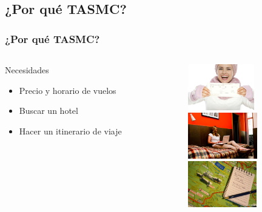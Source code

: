 \documentclass[12pt]{beamer}
\begin{document}
\subsection{¿Por qué TASMC?}
\begin{frame}
	\frametitle{¿Por qué TASMC?}
	\begin{columns} 
		\begin{column}{5cm} 
			\begin{block}{Necesidades} \small 
				\begin{itemize}
					\item Precio y horario de vuelos
					\item Buscar un hotel
					\item Hacer un itinerario de viaje
				\end{itemize} 
			\end{block} 
		\end{column}
		\begin{column}{5cm} 
			\begin{center}
				\includegraphics[height=2cm]{imagenes/nvuelo.jpg} \\
				\includegraphics[height=2cm]{imagenes/nhotel.jpg} \\
				\includegraphics[height=2cm]{imagenes/nitinerario.jpg}
			\end{center} 
		\end{column} 
	\end{columns}
\end{frame}
\end{document}
